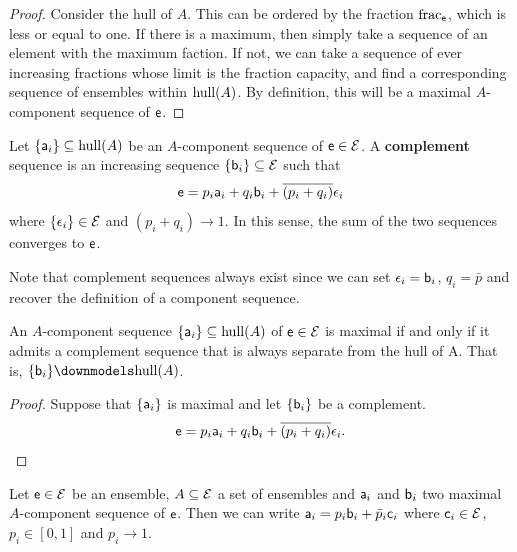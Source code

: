\begin{proof}
	Consider the hull of $A$. This can be ordered by the fraction $\size_{\ens}$, which is less or equal to one. If there is a maximum, then simply take a sequence of an element with the maximum faction. If not, we can take a sequence of ever increasing fractions whose limit is the fraction capacity, and find a corresponding sequence of ensembles within $\hull(A)$. By definition, this will be a maximal $A$-component sequence of $\ens$.
\end{proof}

\begin{prop}
	Let $\{\ens[a]_i\} \subseteq \hull(A)$ be an $A$-component sequence of $\ens \in \Ens$. A \textbf{complement} sequence is an increasing sequence $\{\ens[b]_i\} \subseteq \Ens$ such that
	$$ \ens = p_i \ens[a]_i + q_i \ens[b]_i + \overline{(p_i + q_i)} \ens[\epsilon]_i $$
	where $\{\ens[\epsilon]_i\} \in \Ens$ and $(p_i + q_i) \to 1$. In this sense, the sum of the two sequences converges to $\ens$.
\end{prop}

\begin{remark}
	Note that complement sequences always exist since we can set $\ens[\epsilon]_i = \ens[b]_i$, $q_i = \bar{p}$ and recover the definition of a component sequence.
\end{remark}

\begin{prop}
	An $A$-component sequence $\{\ens[a]_i\} \subseteq \hull(A)$ of $\ens \in \Ens$ is maximal if and only if it admits a complement sequence that is always separate from the hull of A. That is, $\{\ens[b]_i\} \separate \hull(A)$.
\end{prop}

\begin{proof}
	Suppose that $\{\ens[a]_i\}$ is maximal and let $\{\ens[b]_i\}$ be a complement.
	$$ \ens = p_i \ens[a]_i + q_i \ens[b]_i + \overline{(p_i + q_i)} \ens[\epsilon]_i.$$
	
\end{proof}

\begin{prop}
	Let $\ens \in \Ens$ be an ensemble, $A \subseteq \Ens$ a set of ensembles and $\ens[a]_i$ and $\ens[b]_i$ two maximal $A$-component sequence of $\ens$. Then we can write $\ens[a]_i = p_i \ens[b]_i + \bar{p}_i \ens[c]_i$ where $\ens[c]_i \in \Ens$, $p_i \in [0,1]$ and $p_i \to 1$.
\end{prop}

